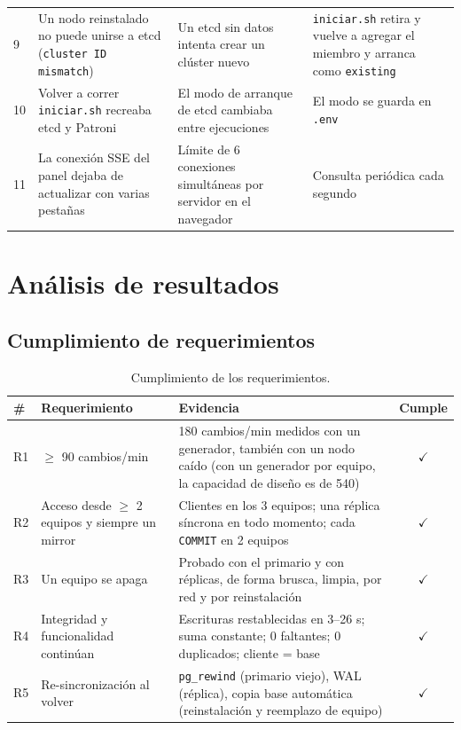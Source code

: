 \documentclass[11pt,a4paper]{article}
\newcommand{\cod}[1]{\texttt{#1}}
\newcommand{\ok}{\textcolor{verde}{\ensuremath{\checkmark}}}
\begin{document}
\begin{longtable}{@{}L{0.4cm}L{4.3cm}L{4.4cm}L{5.2cm}@{}}
\small 9 & \small Un nodo reinstalado no puede unirse a etcd (\cod{cluster ID mismatch}) & \small Un etcd sin datos intenta crear un clúster nuevo & \small \cod{iniciar.sh} retira y vuelve a agregar el miembro y arranca como \cod{existing} \\
\small 10 & \small Volver a correr \cod{iniciar.sh} recreaba etcd y Patroni & \small El modo de arranque de etcd cambiaba entre ejecuciones & \small El modo se guarda en \cod{.env} \\
\small 11 & \small La conexión SSE del panel dejaba de actualizar con varias pestañas & \small Límite de 6 conexiones simultáneas por servidor en el navegador & \small Consulta periódica cada segundo \\
\end{longtable}

\section{Análisis de resultados}

\subsection{Cumplimiento de requerimientos}

\begin{table}[H]
\centering
\small
\caption{Cumplimiento de los requerimientos.}
\begin{tabularx}{\textwidth}{@{}lL{3.6cm}Yc@{}}
\toprule
\textbf{\#} & \textbf{Requerimiento} & \textbf{Evidencia} & \textbf{Cumple} \\
\midrule
R1 & $\geq$ 90 cambios/min & 180 cambios/min medidos con un generador, también con un nodo caído (con un generador por equipo, la capacidad de diseño es de 540) & \ok \\
R2 & Acceso desde $\geq$ 2 equipos y siempre un mirror & Clientes en los 3 equipos; una réplica síncrona en todo momento; cada \cod{COMMIT} en 2 equipos & \ok \\
R3 & Un equipo se apaga & Probado con el primario y con réplicas, de forma brusca, limpia, por red y por reinstalación & \ok \\
R4 & Integridad y funcionalidad continúan & Escrituras restablecidas en 3--26 s; suma constante; 0 faltantes; 0 duplicados; cliente = base & \ok \\
R5 & Re-sincronización al volver & \cod{pg\_rewind} (primario viejo), WAL (réplica), copia base automática (reinstalación y reemplazo de equipo) & \ok \\
\bottomrule
\end{tabularx}
\end{table}
\end{document}
